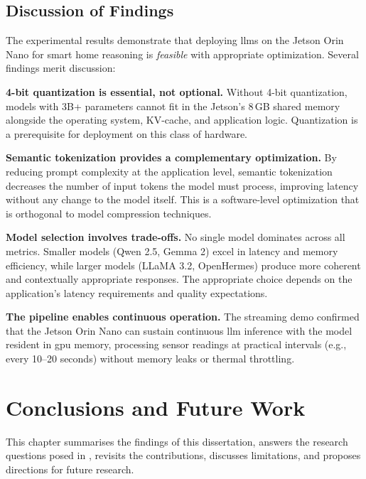 \documentclass[12pt,a4paper,oneside]{report}
\begin{document}
\section{Discussion of Findings}
\label{sec:res-discussion}

The experimental results demonstrate that deploying \glspl{llm} on the Jetson Orin Nano for smart home reasoning is \textit{feasible} with appropriate optimization. Several findings merit discussion:

\textbf{4-bit quantization is essential, not optional.} Without 4-bit quantization, models with 3B+ parameters cannot fit in the Jetson's 8\,GB shared memory alongside the operating system, KV-cache, and application logic. Quantization is a prerequisite for deployment on this class of hardware.

\textbf{Semantic tokenization provides a complementary optimization.} By reducing prompt complexity at the application level, semantic tokenization decreases the number of input tokens the model must process, improving latency without any change to the model itself. This is a software-level optimization that is orthogonal to model compression techniques.

\textbf{Model selection involves trade-offs.} No single model dominates across all metrics. Smaller models (Qwen 2.5, Gemma 2) excel in latency and memory efficiency, while larger models (LLaMA 3.2, OpenHermes) produce more coherent and contextually appropriate responses. The appropriate choice depends on the application's latency requirements and quality expectations.

\textbf{The pipeline enables continuous operation.} The streaming demo confirmed that the Jetson Orin Nano can sustain continuous \gls{llm} inference with the model resident in \gls{gpu} memory, processing sensor readings at practical intervals (e.g., every 10--20 seconds) without memory leaks or thermal throttling.

\chapter{Conclusions and Future Work}
\label{ch:conclusions}

This chapter summarises the findings of this dissertation, answers the research questions posed in , revisits the contributions, discusses limitations, and proposes directions for future research.
\end{document}
